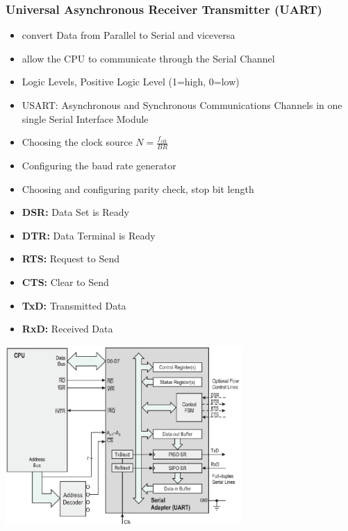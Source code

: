 \subsubsection{Universal Asynchronous Receiver Transmitter (\acs{UART})}
\begin{minipage}{10cm}
	\begin{itemize}
		\item convert Data from Parallel to Serial and viceversa
		\item allow the \acs{CPU} to communicate through the Serial Channel
		\item Logic Levels, Positive Logic Level (1=high, 0=low)
		\item \acs{USART}: Asynchronous and Synchronous Communications Channels in one single Serial Interface Module
		\item Choosing the clock source $N=\frac{f_{clk}}{BR}$
		\item Configuring the baud rate generator
		\item Choosing and configuring parity check, stop bit length
		\item \textbf{\acs{DSR}: }Data Set is Ready
		\item \textbf{\acs{DTR}: }Data Terminal is Ready
		\item \textbf{\acs{RTS}: }Request to Send
		\item \textbf{\acs{CTS}: }Clear to Send
		\item \textbf{\acs{TxD}: }Transmitted Data
		\item \textbf{\acs{RxD}: }Received Data
	\end{itemize}
\end{minipage}
\begin{minipage}{9cm}
	\includegraphics[width=9cm]{images/uart}
\end{minipage}

